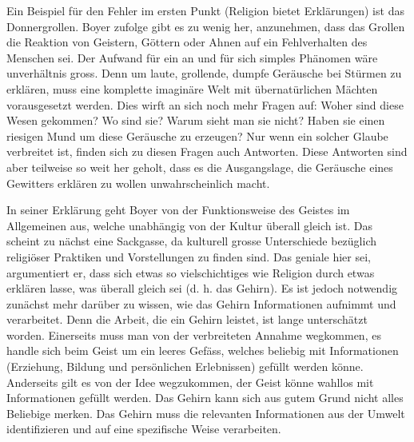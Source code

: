 Ein Beispiel für den Fehler im ersten Punkt (Religion bietet Erklärungen) ist das Donnergrollen. Boyer zufolge gibt es zu wenig her, anzunehmen, dass das Grollen die Reaktion von Geistern, Göttern oder Ahnen auf ein Fehlverhalten des Menschen sei. Der Aufwand für ein an und für sich simples Phänomen wäre unverhältnis gross. Denn um laute, grollende, dumpfe Geräusche bei Stürmen zu erklären, muss eine komplette imaginäre Welt mit übernatürlichen Mächten vorausgesetzt werden. Dies wirft an sich noch mehr Fragen auf: Woher sind diese Wesen gekommen? Wo sind sie? Warum sieht man sie nicht? Haben sie einen riesigen Mund um diese Geräusche zu erzeugen? Nur wenn ein solcher Glaube verbreitet ist, finden sich zu diesen Fragen auch Antworten. Diese Antworten sind aber teilweise so weit her geholt, dass es die Ausgangslage, die Geräusche eines Gewitters erklären zu wollen unwahrscheinlich macht. 

In seiner Erklärung geht Boyer von der Funktionsweise des Geistes im Allgemeinen aus, welche unabhängig von der Kultur überall gleich ist. Das scheint zu nächst eine Sackgasse, da kulturell grosse Unterschiede bezüglich religiöser Praktiken und Vorstellungen zu finden sind. Das geniale hier sei, argumentiert er, dass sich etwas so vielschichtiges wie Religion durch etwas erklären lasse, was überall gleich sei (d. h. das Gehirn). Es ist jedoch notwendig zunächst mehr darüber zu wissen, wie das Gehirn Informationen aufnimmt und verarbeitet.\todo{[S.11]} Denn die Arbeit, die ein Gehirn leistet, ist lange unterschätzt worden. Einerseits muss man von der verbreiteten Annahme wegkommen, es handle sich beim Geist um ein leeres Gefäss, welches beliebig mit Informationen (Erziehung, Bildung und persönlichen Erlebnissen) gefüllt werden könne. Anderseits gilt es von der Idee wegzukommen, der Geist könne wahllos mit Informationen gefüllt werden. Das Gehirn kann sich aus gutem Grund nicht alles Beliebige merken. Das Gehirn muss die relevanten Informationen aus der Umwelt identifizieren und auf eine spezifische Weise verarbeiten.\todo{[S. 12]} 


